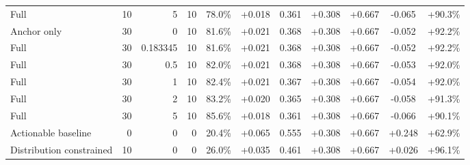 \begin{table}[htbp]
\begin{tabular}{lrrrccccccc}
Full & 10 & 5 & 10 & 78.0\% & +0.018 & 0.361 & +0.308 & +0.667 & -0.065 & +90.3\% \\
Anchor only & 30 & 0 & 10 & 81.6\% & +0.021 & 0.368 & +0.308 & +0.667 & -0.052 & +92.2\% \\
Full & 30 & 0.183345 & 10 & 81.6\% & +0.021 & 0.368 & +0.308 & +0.667 & -0.052 & +92.2\% \\
Full & 30 & 0.5 & 10 & 82.0\% & +0.021 & 0.368 & +0.308 & +0.667 & -0.053 & +92.0\% \\
Full & 30 & 1 & 10 & 82.4\% & +0.021 & 0.367 & +0.308 & +0.667 & -0.054 & +92.0\% \\
Full & 30 & 2 & 10 & 83.2\% & +0.020 & 0.365 & +0.308 & +0.667 & -0.058 & +91.3\% \\
Full & 30 & 5 & 10 & 85.6\% & +0.018 & 0.361 & +0.308 & +0.667 & -0.066 & +90.1\% \\
Actionable baseline & 0 & 0 & 0 & 20.4\% & +0.065 & 0.555 & +0.308 & +0.667 & +0.248 & +62.9\% \\
Distribution constrained & 10 & 0 & 0 & 26.0\% & +0.035 & 0.461 & +0.308 & +0.667 & +0.026 & +96.1\% \\
\bottomrule
\end{tabular}
\end{table}